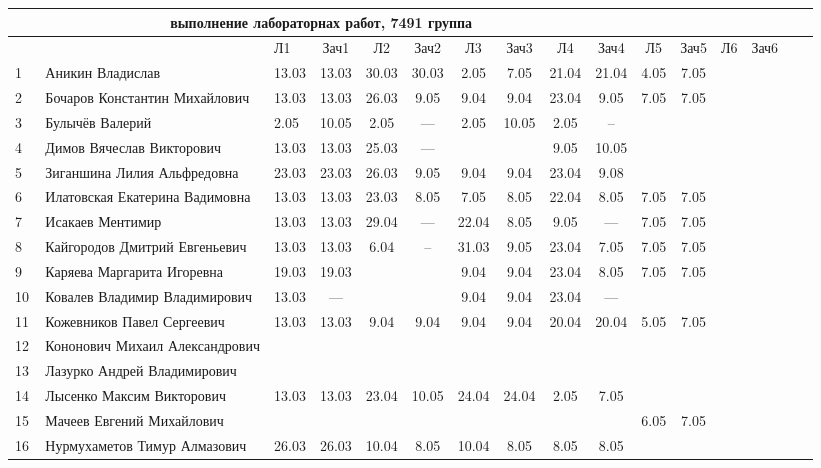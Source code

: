 \documentclass[a4paper,11pt]{article}
\begin{document}
\newpage
{}
\recalctypearea
\hspace{-6.1cm} %
\begin{tabular}{l|llccccccccccccc}
\multicolumn{10}{c}{выполнение лабораторнах работ, 7491 группа} \\
\toprule
&&Л1&Зач1& Л2&Зач2& Л3&Зач3& Л4&Зач4&  Л5&Зач5& Л6&Зач6&\\
\midrule
1\,&Аникин Владислав                &13.03&13.03 &30.03&30.03& 2.05& 7.05&21.04&21.04& 4.05& 7.05 & &\\
2\,&Бочаров Константин Михайлович   &13.03&13.03 &26.03& 9.05& 9.04& 9.04&23.04& 9.05& 7.05& 7.05\\
3\,&Булычёв Валерий                 & 2.05&10.05 & 2.05& --- & 2.05&10.05& 2.05& --  &\\
4\,&Димов Вячеслав Викторович       &13.03&13.03 &25.03& --- &     &     & 9.05&10.05\\
5\,&Зиганшина Лилия Альфредовна     &23.03&23.03 &26.03& 9.05& 9.04& 9.04&23.04& 9.08\\
\midrule
6\,&Илатовская Екатерина Вадимовна  &13.03&13.03 &23.03& 8.05& 7.05& 8.05&22.04& 8.05& 7.05& 7.05\\
7\,&Исакаев Ментимир                &13.03&13.03 &29.04& --- &22.04& 8.05& 9.05& --- & 7.05& 7.05\\
8\,&Кайгородов Дмитрий Евгеньевич   &13.03&13.03 & 6.04& --  &31.03& 9.05&23.04& 7.05& 7.05& 7.05\\
9\,&Каряева Маргарита Игоревна      &19.03&19.03 &     &     & 9.04& 9.04&23.04& 8.05& 7.05& 7.05\\
10\,&Ковалев Владимир Владимирович  &13.03& ---  &     &     & 9.04& 9.04&23.04& --- & &\\
\midrule
11\,&Кожевников Павел Сергеевич     &13.03&13.03 & 9.04& 9.04& 9.04& 9.04&20.04&20.04& 5.05& 7.05\\
12\,&Кононович Михаил Александрович &     &      &     &     &     &     &     &\\
13\,&Лазурко Андрей Владимирович    &     &      &     &     &     &     &     &\\
14\,&Лысенко Максим Викторович      &13.03&13.03 &23.04&10.05&24.04&24.04& 2.05& 7.05\\
15\,&Мачеев Евгений Михайлович      &     &      &     &     &     &     &     &     & 6.05& 7.05\\
\midrule
16\,&Нурмухаметов Тимур Алмазович   &26.03&26.03 &10.04& 8.05&10.04& 8.05& 8.05& 8.05& &\\

\end{tabular}
\end{document}
